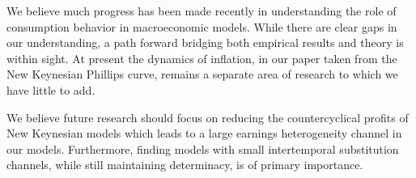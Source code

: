 \documentclass[titlepage]{\econtex}\newcommand{\texname}{ConsumptionHeterogeneity}
\begin{document}
We believe much progress has been made recently in understanding the role of consumption behavior in macroeconomic models. While there are clear gaps in our understanding, a path forward bridging both empirical results and theory is within sight. At present the dynamics of inflation, in our paper taken from the New Keynesian Phillips curve, remains a separate area of research to which we have little to add.

We believe future research should focus on reducing the countercyclical profits of New Keynesian models which leads to a large earnings heterogeneity channel in our models. Furthermore, finding models with small intertemporal substitution channels, while still maintaining determinacy, is of primary importance.



\small

\normalsize
\end{document}
